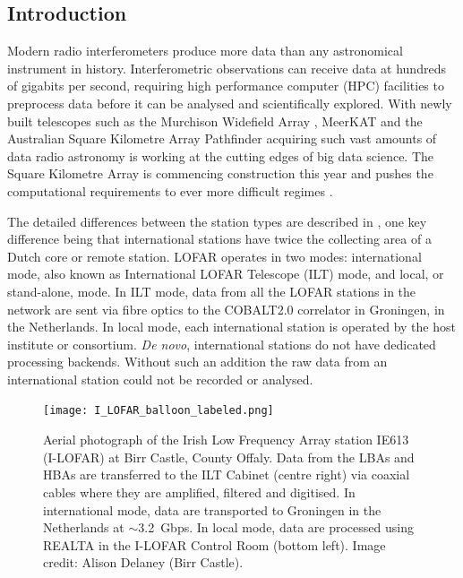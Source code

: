 \subsection{Introduction}
\label{sec:realta_intro}
Modern radio interferometers produce more data than any astronomical instrument in history. Interferometric observations can receive data at hundreds of gigabits per second, requiring high performance computer (HPC) facilities to preprocess data before it can be analysed and scientifically explored. With newly built telescopes such as the Murchison Widefield Array \citep[MWA;][]{Lonsdale2009}, MeerKAT \citep{Jonas2016} and the Australian Square Kilometre Array Pathfinder \citep[ASKAP;][]{Johnston2008} acquiring such vast amounts of data \citep[up to $300$~Gbps;][]{Voronkov2020, Lonsdale2009} radio astronomy is working at the cutting edges of big data science. The Square Kilometre Array \citep{McMullin2020} is commencing construction this year and pushes the computational requirements to ever more difficult regimes \citep{Scaife2020}.

 The detailed differences between the station types are described in \cite{VanHaarlem2013}, one key difference being that international stations have twice the collecting area of a Dutch core or remote station. LOFAR operates in two modes: international mode, also known as International LOFAR Telescope (ILT) mode, and local, or stand-alone, mode. In ILT mode, data from all the LOFAR stations in the network are sent via fibre optics to the COBALT2.0 correlator \citep[an upgrade to COBALT1.0,][]{Broekema2018} in Groningen, in the Netherlands. In local mode, each international station is operated by the host institute or consortium. \textit{De novo}, international stations do not have dedicated processing backends. Without such an addition the raw data from an international station could not be recorded or analysed. 

\begin{figure}[ht]
    \centering
    \texttt{[image: I\_LOFAR\_balloon\_labeled.png]}
    \caption[Aerial photograph of the Irish Low Frequency Array station IE613 (I-LOFAR) at Birr Castle, County Offaly.]{Aerial photograph of the Irish Low Frequency Array station IE613 (I-LOFAR) at Birr Castle, County Offaly. Data from the LBAs and HBAs are transferred to the ILT Cabinet (centre right) via coaxial cables where they are amplified, filtered and digitised. In international mode, data are transported to Groningen in the Netherlands at $\sim$3.2~Gbps. In local mode, data are processed using REALTA in the I-LOFAR Control Room (bottom left). Image credit: Alison Delaney (Birr Castle).}
    \label{fig:ILOFAR}
\end{figure}

